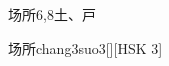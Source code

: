 \begin{entry}{场所}{6,8}{⼟、⼾}
  \begin{phonetics}{场所}{chang3suo3}[][HSK 3]
  \end{phonetics}
\end{entry}
